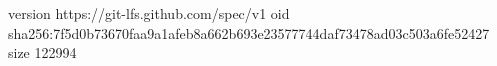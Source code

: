 version https://git-lfs.github.com/spec/v1
oid sha256:7f5d0b73670faa9a1afeb8a662b693e23577744daf73478ad03c503a6fe52427
size 122994
